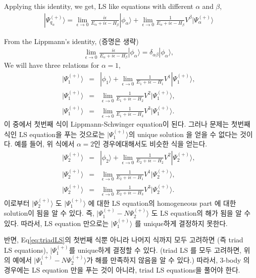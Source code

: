 \documentclass[11pt]{article}
\newcommand{\bea}{\begin{eqnarray}}
\newcommand{\eea}{\end{eqnarray}}
\newcommand{\no}{\nonumber \\}
\newcommand{\ra}{\rangle}
\begin{document}
Applying this identity, we get, LS like equations with different $\alpha$ and $\beta$, 
\bea 
|\Psi_{q_\alpha}^{(+)}\ra = \lim_{\epsilon\to 0} \frac{i\epsilon}{E_\alpha+i\epsilon-H_\beta}|\phi_{\alpha}\ra 
 +\lim_{\epsilon\to 0}\frac{1}{E_\alpha+i\epsilon-H_\beta}V^\beta|\Psi^{(+)}_{\alpha}\ra 
\eea 

From the Lippmann's identity, (증명은 생략)
\bea 
\lim_{\epsilon\to 0} \frac{i\epsilon}{E_\alpha+i\epsilon-H_\beta}|\phi_{\alpha}\ra
 =\delta_{\alpha\beta}|\phi_{\alpha}\ra, 
\eea 
We will have three relations for $\alpha=1$,
\bea 
\label{eq:triadLS}
|\Psi_1^{(+)}\ra&=& |\phi_1\ra + \lim_{\epsilon\to 0}\frac{1}{E_1+i\epsilon-H_1}V^1|\Psi^{(+)}_{1}\ra ,\no 
|\Psi_1^{(+)}\ra&=&  \lim_{\epsilon\to 0}\frac{1}{E_1+i\epsilon-H_2}V^2|\Psi^{(+)}_{1}\ra ,\no 
|\Psi_1^{(+)}\ra&=&  \lim_{\epsilon\to 0}\frac{1}{E_1+i\epsilon-H_3}V^3|\Psi^{(+)}_{1}\ra.
\eea 
이 중에서 첫번째 식이 Lippmann-Schwinger equation이 된다. 
그러나 문제는 첫번째 식인 LS equation을 푸는 것으로는 $|\Psi^{(+)}_1\ra$의 unique solution 을 
얻을 수 없다는 것이다. 예를 들어,
위 식에서 $\alpha=2$인 경우에대해서도 비슷한 식을 얻는다.
\bea 
|\Psi_2^{(+)}\ra&=& |\phi_2\ra + \lim_{\epsilon\to 0}\frac{1}{E_2+i\epsilon-H_2}V^2|\Psi^{(+)}_{2}\ra ,\no 
|\Psi_2^{(+)}\ra&=&  \lim_{\epsilon\to 0}\frac{1}{E_2+i\epsilon-H_1}V^1|\Psi^{(+)}_{2}\ra ,\no 
|\Psi_2^{(+)}\ra&=&  \lim_{\epsilon\to 0}\frac{1}{E_2+i\epsilon-H_3}V^3|\Psi^{(+)}_{2}\ra.
\eea 
이로부터 $|\Psi_2^{(+)}\ra$ 도 $|\Psi_1^{(+)}\ra$ 에 대한 LS equation의 homogeneous part
에 대한 solution이 됨을 알 수 있다. 즉, $|\Psi_1^{(+)}-N \Psi_2^{(+)}\ra$ 도
LS equation의 해가 됨을 알 수 있다. 따라서, LS equation 만으로는 $|\Psi_1^{(+)}\ra$ 를 
unique하게 결정하지 못한다. 

반면, Eq\eqref{eq:triadLS}의 첫번째 식뿐 아니라 나머지 식까지 모두 고려하면 (즉 triad LS equations), 
$|\Psi_1^{(+)}$를 unique하게 결정할 수 있다. (triad LS 를 모두 고려하면,  
위의 예에서 $|\Psi_1^{(+)}-N \Psi_2^{(+)}\ra$가 해를 만족하지 않음을 알 수 있다.)
따라서, 3-body 의 경우에는 LS equation 만을 푸는 것이 아니라, triad LS equations을 
풀어야 한다. 
\end{document}
